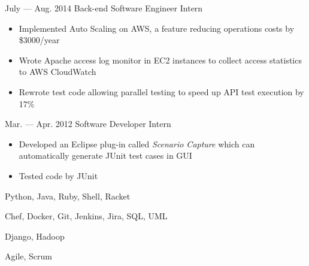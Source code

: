 \documentclass{newresume}
\begin{document}
\begin{body}
	{July --- Aug. 2014}
	{Back-end Software Engineer Intern}
	{}
	\begin{itemize}[noitemsep,topsep=0pt]
		\item Implemented Auto Scaling on AWS, a feature reducing operations costs by \$3000/year
		\item Wrote Apache access log monitor in EC2 instances to collect access statistics to AWS CloudWatch
		\item Rewrote test code allowing parallel testing to speed up API test execution by 17\%
	\end{itemize}
\end{body}

\begin{body}
	{Mar. --- Apr. 2012}
	{Software Developer Intern}
	{}
	\begin{itemize}[noitemsep,topsep=0pt]
		\item Developed an Eclipse plug-in called \textit{Scenario Capture} which can automatically
			  generate JUnit test cases in GUI
		\item Tested code by JUnit
	\end{itemize}
\end{body}
\smallskip


\begin{description}[style=nextline,leftmargin=8em,topsep=1pt]
	\item[Languages] Python, Java, Ruby, Shell, Racket
	\item[Tools] Chef, Docker, Git, Jenkins, Jira, SQL, UML
	\item[Frameworks] Django, Hadoop
	\item[Methodologies] Agile, Scrum
\end{description}





%
\end{document}
